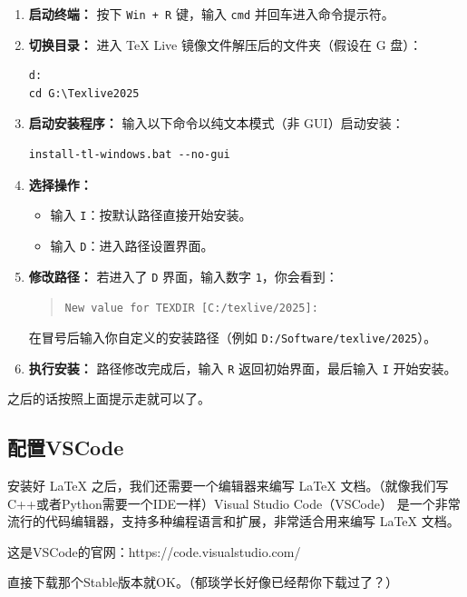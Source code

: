\begin{enumerate}
    \item \textbf{启动终端：} 按下 \texttt{Win + R} 键，输入 \texttt{cmd} 并回车进入命令提示符。
    
    \item \textbf{切换目录：} 进入 TeX Live 镜像文件解压后的文件夹（假设在 G 盘）：
    \begin{lstlisting}
d:
cd G:\Texlive2025
    \end{lstlisting}
    
    \item \textbf{启动安装程序：} 输入以下命令以纯文本模式（非 GUI）启动安装：
    \begin{lstlisting}
install-tl-windows.bat --no-gui
    \end{lstlisting}
    
    \item \textbf{选择操作：} 
    \begin{itemize}
        \item 输入 \texttt{I}：按默认路径直接开始安装。
        \item 输入 \texttt{D}：进入路径设置界面。
    \end{itemize}

    \item \textbf{修改路径：} 若进入了 \texttt{D} 界面，输入数字 \texttt{1}，你会看到：
    \begin{quote}
        \texttt{New value for TEXDIR [C:/texlive/2025]:}
    \end{quote}
    在冒号后输入你自定义的安装路径（例如 \texttt{D:/Software/texlive/2025}）。

    \item \textbf{执行安装：} 路径修改完成后，输入 \texttt{R} 返回初始界面，最后输入 \texttt{I} 开始安装。
\end{enumerate}
之后的话按照上面提示走就可以了。

\subsection{配置VSCode}
安装好 \LaTeX{} 之后，我们还需要一个编辑器来编写 \LaTeX{} 文档。（就像我们写C++或者Python需要一个IDE一样）Visual Studio Code（VSCode） 是一个非常流行的代码编辑器，支持多种编程语言和扩展，非常适合用来编写 \LaTeX{} 文档。

这是VSCode的官网：https://code.visualstudio.com/

直接下载那个Stable版本就OK。（郁琰学长好像已经帮你下载过了？）

